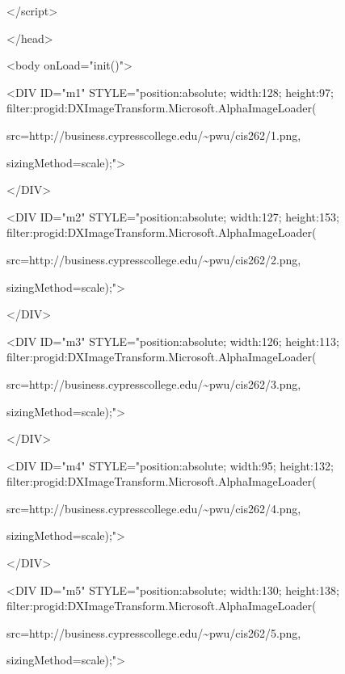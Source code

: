 \documentclass[
]{article}
\begin{document}
\textless/script\textgreater{}

\textless/head\textgreater{}

\textless body onLoad="init()"\textgreater{}

\textless DIV ID="m1" STYLE="position:absolute; width:128; height:97;
filter:progid:DXImageTransform.Microsoft.AlphaImageLoader(

src=\textquotesingle http://business.cypresscollege.edu/\textasciitilde pwu/cis262/1.png\textquotesingle,

sizingMethod=\textquotesingle scale\textquotesingle);"\textgreater{}

\textless/DIV\textgreater{}

\textless DIV ID="m2" STYLE="position:absolute; width:127; height:153;
filter:progid:DXImageTransform.Microsoft.AlphaImageLoader(

src=\textquotesingle http://business.cypresscollege.edu/\textasciitilde pwu/cis262/2.png\textquotesingle,

sizingMethod=\textquotesingle scale\textquotesingle);"\textgreater{}

\textless/DIV\textgreater{}

\textless DIV ID="m3" STYLE="position:absolute; width:126; height:113;
filter:progid:DXImageTransform.Microsoft.AlphaImageLoader(

src=\textquotesingle http://business.cypresscollege.edu/\textasciitilde pwu/cis262/3.png\textquotesingle,

sizingMethod=\textquotesingle scale\textquotesingle);"\textgreater{}

\textless/DIV\textgreater{}

\textless DIV ID="m4" STYLE="position:absolute; width:95; height:132;
filter:progid:DXImageTransform.Microsoft.AlphaImageLoader(

src=\textquotesingle http://business.cypresscollege.edu/\textasciitilde pwu/cis262/4.png\textquotesingle,

sizingMethod=\textquotesingle scale\textquotesingle);"\textgreater{}

\textless/DIV\textgreater{}

\textless DIV ID="m5" STYLE="position:absolute; width:130; height:138;
filter:progid:DXImageTransform.Microsoft.AlphaImageLoader(

src=\textquotesingle http://business.cypresscollege.edu/\textasciitilde pwu/cis262/5.png\textquotesingle,

sizingMethod=\textquotesingle scale\textquotesingle);"\textgreater{}
\end{document}

